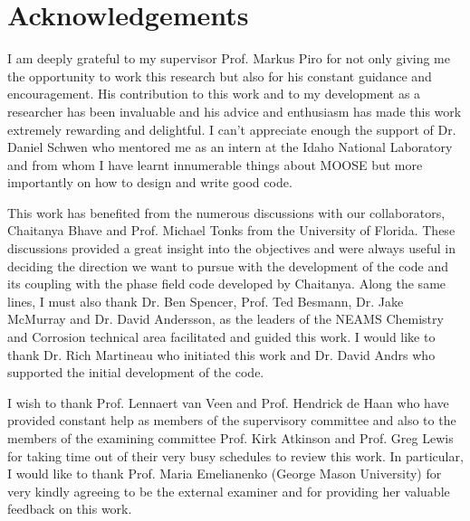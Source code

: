 \chapter*{Acknowledgements}
\label{acknowledgements}

I am deeply grateful to my supervisor Prof. Markus Piro for not only giving me the opportunity to work this research but also for his constant guidance and encouragement. His contribution to this work and to my development as a researcher has been invaluable and his advice and enthusiasm has made this work extremely rewarding and delightful. I can't appreciate enough the support of Dr. Daniel Schwen who mentored me as an intern at the Idaho National Laboratory and from whom I have learnt innumerable things about MOOSE but more importantly on how to design and write good code.

This work has benefited from the numerous discussions with our collaborators, Chaitanya Bhave and Prof. Michael Tonks from the University of Florida. These discussions provided a great insight into the objectives and were always useful in deciding the direction we want to pursue with the development of the code and its coupling with the phase field code developed by Chaitanya. Along the same lines, I must also thank Dr. Ben Spencer, Prof. Ted Besmann, Dr. Jake McMurray and Dr. David Andersson, as the leaders of the NEAMS Chemistry and Corrosion technical area facilitated and guided this work. I would like to thank Dr. Rich Martineau who initiated this work and Dr. David Andrs who supported the initial development of the code.

I wish to thank Prof. Lennaert van Veen and Prof. Hendrick de Haan who have provided constant help as members of the supervisory committee and also to the members of the examining committee Prof. Kirk Atkinson and Prof. Greg Lewis for taking time out of their very busy schedules to review this work. In particular, I would like to thank Prof. Maria Emelianenko (George Mason University) for very kindly agreeing to be the external examiner and for providing her valuable feedback on this work.


